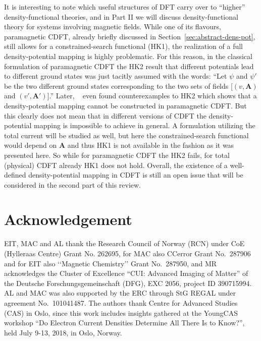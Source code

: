 \documentclass[journal=apcach,manuscript=article,layout=twocolumn]{achemso}
\newcommand{\changed}[1] {{ {#1}}} %
\begin{document}
It is interesting to note which useful structures of DFT carry over to ``higher'' \changed{density-functional} theories, and in Part II we will discuss density-functional theory for systems involving magnetic fields. While one of its flavours, paramagnetic CDFT, already briefly discussed in Section~\ref{sec:abstract-dens-pot}, still allows for a constrained-search functional (HK1), the realization of a full density-potential mapping is highly problematic.
For this reason, in the classical formulation of paramagnetic CDFT \cite{vignale-rasolt-geldart1990} the HK2 result that different potentials lead to different ground states was just tacitly assumed with the words: ``Let $\psi$ and $\psi'$ be the two different ground states corresponding to the two sets of fields [$(v,\mathbf{A})$ and $(v',\mathbf{A}')$].'' Later, \citeauthor{Capelle2002}~\cite{Capelle2002} even found counterexamples to HK2 which shows that a density-potential mapping cannot be constructed in paramagnetic CDFT. But this clearly does not mean that in different versions of CDFT the density-potential mapping is impossible to achieve in general. A formulation utilizing the total current will be studied as well, but here the constrained-search functional would depend on $\mathbf{A}$ and thus HK1 is not available in the fashion as it was presented here. So while for paramagnetic CDFT the HK2 fails, for total (physical) CDFT already HK1 does not hold. Overall, the existence of a well-defined density-potential mapping in CDFT is still an open issue that will be considered in the second part of this review.

\section*{Acknowledgement}

EIT, MAC and AL thank the  Research Council of Norway (RCN) under CoE (Hylleraas Centre) Grant No. 262695, for MAC also CCerror Grant No.~287906 and for EIT also ‘‘Magnetic Chemistry’’ Grant No.~287950, and MR acknowledges the Cluster of Excellence “CUI: Advanced Imaging of Matter” of the Deutsche Forschungsgemeinschaft (DFG), EXC 2056, project ID 390715994. AL and MAC was also supported by the ERC through StG REGAL under agreement No.~101041487.
The authors thank Centre for Advanced Studies (CAS) in Oslo, since this work includes insights gathered at the YoungCAS workshop ``Do Electron Current Densities Determine All There Is to Know?'', held July 9-13, 2018, in Oslo, Norway.
\end{document}
